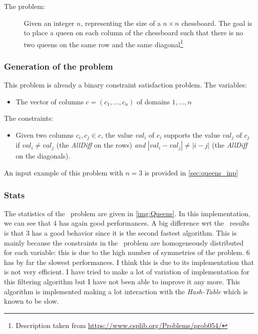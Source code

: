 \documentclass{rapport}
\begin{document}
\begin{description}
  \item[The problem:] Given an integer $n$, representing the size of a $n \times n$ chessboard. The goal is to place a queen on each column of the chessboard such that there is no two queens on the same row and the same diagonal\footnote{Description taken from \url{https://www.csplib.org/Problems/prob054/}}
\end{description}

\subsubsection{Generation of the problem}

This problem is already a binary constraint satisfaction problem.
The variables:
\begin{itemize}
  \item The vector of columns $c = (c_1, \dots, c_n)$ of domains $1, \dots, n$
\end{itemize}

The constraints:
\begin{itemize}
  \item Given two columns $c_i, c_j \in c$, the value $val_i$ of $c_i$ supports the value $val_j$ of $c_j$ if $val_i \neq val_j$ (the \textit{AllDiff} on the rows) \textit{and} $|val_i - val_j| \neq |i - j|$ (the \textit{AllDiff} on the diagonals).
\end{itemize}

An input example of this problem with $n = 3$ is provided in \cref{sec:queens_inp}

\subsubsection{Stats}

The statistics of the \queens\ problem are given in \cref{img:Queens}. In this implementation, we can see that \ac{4} has again good performances. A big difference wrt the \allint\ results is that \ac{3} has a good behavior since it is the second fastest algorithm. This is mainly because the constraints in the \queens\ problem are homogeneously distributed for each variable: this is due to the high number of symmetries of the problem. \ac{6} has by far the slowest performances. I think this is due to its implementation that is not very efficient. I have tried to make a lot of variation of implementation for this filtering algorithm but I have not been able to improve it any more. This algorithm is implemented making a lot interaction with the \textit{Hash-Table} which is known to be slow.
\end{document}
